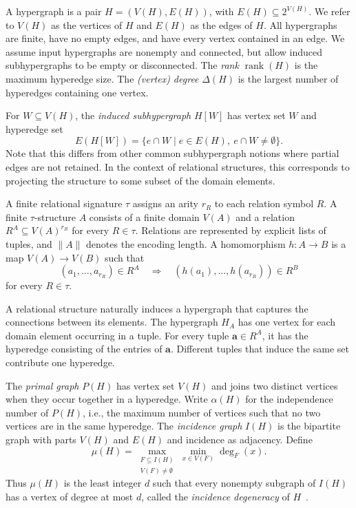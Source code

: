 \documentclass[11pt,letterpaper]{article}
\theoremstyle{definition}
\theoremstyle{remark}
\newcommand{\rank}{\operatorname{rank}}
\begin{document}
A hypergraph is a pair $H=(V(H),E(H))$, with $E(H) \subseteq 2^{V(H)}$. We refer to $V(H)$ as the vertices of $H$ and $E(H)$ as the edges of $H$. All hypergraphs are finite, have no empty edges, and have every vertex contained in an edge. We assume input hypergraphs are nonempty and connected, but allow induced subhypergraphs to be empty or disconnected. The \emph{rank} $\rank(H)$ is
the maximum hyperedge size.  The \emph{(vertex) degree} $\Delta(H)$ is
the largest number of hyperedges containing one vertex.

For $W\subseteq V(H)$, the \emph{induced subhypergraph} $H[W]$ has vertex
set $W$ and hyperedge set
\[
 E(H[W])=\{e\cap W \mid e\in E(H),\ e\cap W\ne\emptyset\}.
\]
Note that this differs from other common subhypergraph notions where partial edges are not retained. In the context of relational structures, this corresponds to projecting the structure to some subset of the domain elements.


A finite relational signature $\tau$ assigns an arity $r_R$ to each relation
symbol $R$. A finite $\tau$-structure $A$ consists of a finite domain
$V(A)$ and a relation $R^A\subseteq V(A)^{r_R}$ for every $R\in\tau$.
Relations are represented by explicit lists of tuples, and $\lVert A\rVert$
denotes the encoding length. A homomorphism $h:A\to B$ is a map
$V(A)\to V(B)$ such that
\[
 (a_1,\ldots,a_{r_R})\in R^A
 \quad\Longrightarrow\quad
 (h(a_1),\ldots,h(a_{r_R}))\in R^B
\]
for every $R\in\tau$.

A relational structure naturally induces a hypergraph that captures the connections between its elements. The hypergraph $H_A$ has one vertex for each domain element occurring in a tuple. For every tuple $\mathbf a\in R^A$, it has the hyperedge consisting of the entries of $\mathbf a$. Different tuples that induce the same set contribute one hyperedge.

The \emph{primal graph} $P(H)$ has vertex set $V(H)$ and joins two distinct
vertices when they occur together in a hyperedge. Write $\alpha(H)$ for the
independence number of $P(H)$, i.e., the maximum number of vertices such that no two vertices are in the same hyperedge. The \emph{incidence graph} $I(H)$ is the bipartite graph with
parts $V(H)$ and $E(H)$ and incidence as adjacency. Define
\[
 \mu(H)=\max_{\substack{F\subseteq I(H)\\V(F)\ne\emptyset}}
          \min_{x\in V(F)}\deg_F(x).
\]
Thus $\mu(H)$ is the least integer $d$ such that every nonempty subgraph
of $I(H)$ has a vertex of degree at most $d$, called the
\emph{incidence degeneracy} of $H$~\cite{MatulaBeck1983}.
%
\end{document}
